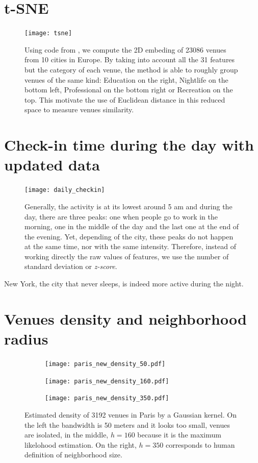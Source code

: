 \documentclass[svgnames,a4paper,final,notitlepage,10pt]{article}
\begin{document}
\section*{t-SNE}

\begin{figure}[htpb]
	\centering
	\texttt{[image: tsne]}
	\caption[2D projection of European venues by t-SNE]{Using code from
	\cite{}, we compute the 2D embeding of 23086 venues from 10 cities in
Europe. By taking into account all the 31 features but the category of each
venue, the method is able to roughly group venues of the same kind: Education
on the right, Nightlife on the bottom left, Professional on the bottom right
or Recreation on the top. This motivate the use of Euclidean distance in this
reduced space to measure venues similarity.\label{fig:tsne}}
\end{figure}
\clearpage

\section*{Check-in time during the day with updated data}
\begin{figure}[htpb]
	\centering
	\texttt{[image: daily\_checkin]}
	\caption[Pattern of check-in during the day]{Generally, the activity
		is at its lowest around 5 am and during the day, there are
		three peaks: one when people go to work in the morning, one in
		the middle of the day and the last one at the end of the
		evening. Yet, depending of the city, these peaks do not happen
		at the same time, nor with the same intensity. Therefore,
		instead of working directly the raw values of features, we use
		the number of standard deviation or \emph{z-score}.
		\label{fig:daily_checkin}}
\end{figure}

New York, the city that never sleeps, is indeed more active during the night.
\clearpage

\section*{Venues density and neighborhood radius}
\begin{figure}[h]
    \begin{subfigure}[b]{0.32\columnwidth}
        \centering
        \texttt{[image: paris\_new\_density\_50.pdf]}
    \end{subfigure}
    \begin{subfigure}[b]{0.32\columnwidth}
        \centering
	\texttt{[image: paris\_new\_density\_160.pdf]}
    \end{subfigure}
    \begin{subfigure}[b]{0.32\columnwidth}
        \centering
	\texttt{[image: paris\_new\_density\_350.pdf]}
    \end{subfigure}
\caption[Venue density in Paris]{Estimated density of 3192 venues in Paris by a
	Gaussian kernel. On the left the bandwidth is 50 meters and it looks
too small, venues are isolated, in the middle, $h=160$ because it is the maximum
likelohood estimation. On the right, $h=350$ corresponds to human definition
of neighborhood size.\label{fig:density_paris}}
\end{figure}
\clearpage
\end{document}
